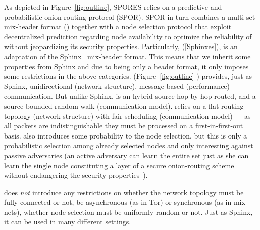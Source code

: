 
As depicted in Figure~\ref{fig:outline}, \ac{SPORES} relies on a predictive and probabilistic onion routing protocol (\ac{SPOR}). \ac{SPOR} in turn combines a multi-set mix-header format (\Sphinxes) together with a node selection protocol that exploit decentralized prediction regarding node availability to optimize the reliability of \Sphinxes without jeopardizing its security properties.
Particularly, \sphinxes (\cref{Sphinxes}), is an adaptation of the 
 Sphinx~\cite{Sphinx} mix-header format.
This means that we inherit some properties from Sphinx and due to being only a 
header format, it only imposes some restrictions in the above categories.
\Sphinxes (Figure~\ref{fig:outline} ) provides, just as Sphinx, unidirectional (network structure), 
message-based (performance) communication.
But unlike Sphinx, \Sphinxes is an hybrid source-hop-by-hop routed, and a
source-bounded random walk (communication 
model). \Sphinxes relies on a flat routing-topology (network structure) with fair 
scheduling (communication model) --- as all packets are indistinguishable they 
must be processed on a first-in-first-out basis.
\Sphinxes also introduces some probability to the node selection, but this is 
only a probabilistic selection among already selected nodes and only 
interesting against passive adversaries (an active adversary can learn the 
entire set just as she can learn the single node constituting a layer of a
secure onion-routing scheme without endangering the security
properties~\cite{CLOnionRouting}).

\Sphinxes does \emph{not} introduce any restrictions on whether the network 
topology must be fully connected or not, be asynchronous (as in Tor) or 
synchronous (as in mix-nets), whether node selection must be uniformly random 
or not.
Just as Sphinx, it can be used in many different settings.

